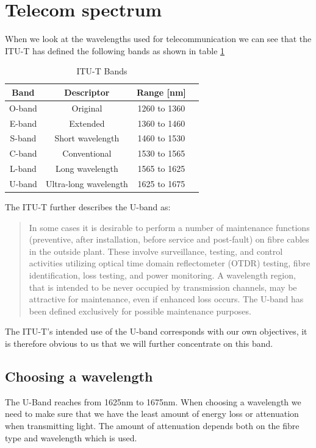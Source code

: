 \documentclass{article}
\begin{document}
\section{Telecom spectrum}
When we look at the wavelengths used for telecommunication we can see that the ITU-T has defined the following bands as shown in table \ref{tab:bands}
\begin{table}[h]
\centering
\begin{tabular}{|c|c|c|c|}
\hline 
\textbf{Band} & \textbf{Descriptor} & \textbf{Range [nm]}\\ 
\hline 
O-band & Original & 1260 to 1360 \\ 
\hline 
E-band & Extended & 1360 to 1460 \\ 
\hline 
S-band & Short wavelength & 1460 to 1530 \\ 
\hline 
C-band & Conventional & 1530 to 1565 \\ 
\hline 
L-band & Long wavelength & 1565 to 1625 \\ 
\hline 
U-band & Ultra-long wavelength & 1625 to 1675 \\ 
\hline 
\end{tabular} 
\caption{ITU-T Bands\cite[p. 134]{itu-t:manual2009}
\label{tab:bands}
}
\end{table}

The ITU-T further describes the U-band as:
\begin{quote}
In some cases it is desirable to perform a number of maintenance functions (preventive, after
installation, before service and post-fault) on fibre cables in the outside plant. These involve
surveillance, testing, and control activities utilizing optical time domain reflectometer (OTDR)
testing, fibre identification, loss testing, and power monitoring. A wavelength region, that is
intended to be never occupied by transmission channels, may be attractive for maintenance,
even if enhanced loss occurs. The U-band has been defined exclusively for possible
maintenance purposes.
\end{quote}

The ITU-T's intended use of the U-band corresponds with our own objectives, it is therefore obvious to us that we will further concentrate on this band.

\subsection{Choosing a wavelength}
The U-Band reaches from 1625nm to 1675nm. When choosing a wavelength we need to make sure that we have the least amount of energy loss or attenuation when transmitting light.
The amount of attenuation depends both on the fibre type and wavelength which is used. 
\end{document}
